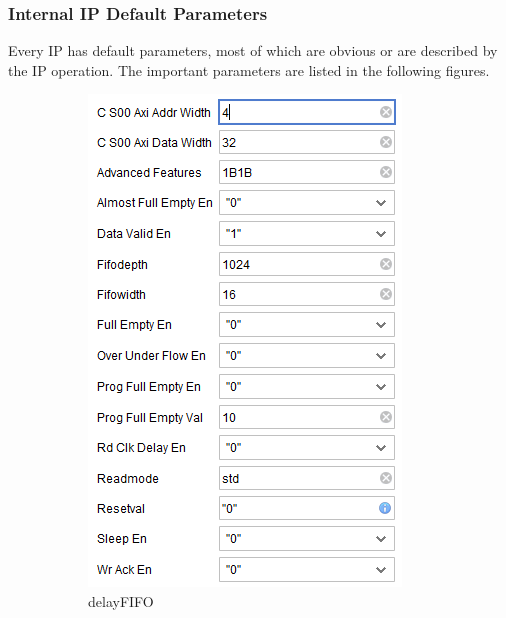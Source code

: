 \documentclass[11pt]{article}
\begin{document}
\subsubsection{Internal IP Default Parameters}
Every IP has default parameters, most of which are obvious or are described by the IP operation. The important parameters are listed in the following
figures.
\begin{figure}[H]
	\centering
	\begin{subfigure}[t]{0.4\linewidth}
		\includegraphics[width=\linewidth]{images/default_dac_param_delay_FIFO}
		\caption{delay\textunderscore FIFO}
	\end{subfigure}
	\begin{subfigure}[t]{0.4\linewidth}

\end{subfigure}
\end{figure}
\end{document}
